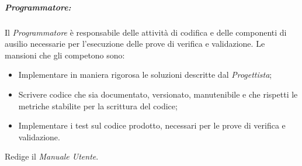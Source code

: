 \subparagraph{Programmatore:}
Il \textit{Programmatore} è responsabile delle attività di codifica e delle componenti di ausilio necessarie per l'esecuzione delle prove di verifica e validazione. Le mansioni che gli competono sono:
\begin{itemize}
	\item Implementare in maniera rigorosa le soluzioni descritte dal \textit{Progettista};
	\item Scrivere codice che sia documentato, versionato, manutenibile e che rispetti le metriche stabilite per la scrittura del codice;
	\item Implementare i test sul codice prodotto, necessari per le prove di verifica e validazione.
\end{itemize}
Redige il \textit{Manuale Utente}.


